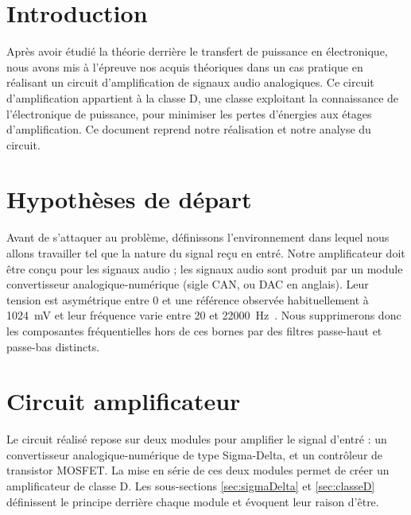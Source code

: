 \documentclass[10pt, oneside, a4paper]{article}
\begin{document}
\tableofcontents
\newpage

\section*{Introduction}
Après avoir étudié la théorie derrière le transfert de puissance en électronique,
nous avons mis à l'épreuve nos acquis théoriques dans un cas pratique en réalisant un circuit d'amplification de signaux audio analogiques.
Ce circuit d'amplification appartient à la classe D, une classe exploitant la connaissance de l'électronique de puissance, pour minimiser les pertes d'énergies aux étages d'amplification.
Ce document reprend notre réalisation et notre analyse du circuit.


\section{Hypothèses de départ}
    \label{sec:hypothese}
Avant de s'attaquer au problème, définissons l'environnement dans lequel nous allons travailler tel que la nature du signal reçu en entré.
Notre amplificateur doit être conçu pour les signaux audio ;
les signaux audio sont produit par un module convertisseur analogique-numérique (sigle CAN, ou DAC en anglais).
Leur tension est asymétrique entre \num{0} et une référence observée habituellement à \SI{1024}{\milli\volt} et leur fréquence varie entre \num{20} et \SI{22000}{\hertz}~\cite{heffner2007hearing}.
Nous supprimerons donc les composantes fréquentielles hors de ces bornes par des filtres passe-haut et passe-bas distincts.


\section{Circuit amplificateur}
Le circuit réalisé repose sur deux modules pour amplifier le signal d'entré :
un convertisseur analogique-numérique de type Sigma-Delta, et un contrôleur de transistor MOSFET.
La mise en série de ces deux modules permet de créer un amplificateur de classe D.
Les sous-sections \ref{sec:sigmaDelta} et \ref{sec:classeD} définissent le principe derrière chaque module et évoquent leur raison d'être.
\end{document}
